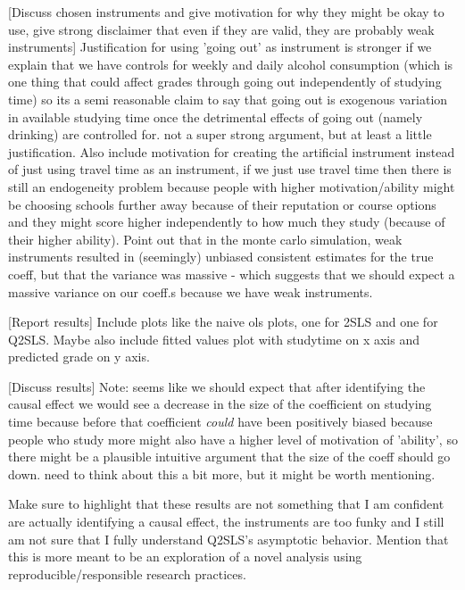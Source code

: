 \documentclass[12pt]{article}
\begin{document}
\textcolor{BrickRed}{[Discuss chosen instruments and give motivation for why they might be okay to use, give strong disclaimer that even if they are valid, they are probably weak instruments]} Justification for using 'going out' as instrument is stronger if we explain that we have controls for weekly and daily alcohol consumption (which is one thing that could affect grades through going out independently of studying time) so its a semi reasonable claim to say that going out is exogenous variation in available studying time once the detrimental effects of going out (namely drinking) are controlled for. not a super strong argument, but at least a little justification. Also include motivation for creating the artificial instrument instead of just using travel time as an instrument, if we just use travel time then there is still an endogeneity problem because people with higher motivation/ability might be choosing schools further away because of their reputation or course options and they might score higher independently to how much they study (because of their higher ability). Point out that in the monte carlo simulation, weak instruments resulted in (seemingly) unbiased consistent estimates for the true coeff, but that the variance was massive - which suggests that we should expect a massive variance on our coeff.s because we have weak instruments.

\textcolor{BrickRed}{[Report results]} Include plots like the naive ols plots, one for 2SLS and one for Q2SLS. Maybe also include fitted values plot with studytime on x axis and predicted grade on y axis.

\textcolor{BrickRed}{[Discuss results]} Note: seems like we should expect that after identifying the causal effect we would see a decrease in the size of the coefficient on studying time because before that coefficient \textit{could} have been positively biased because people who study more might also have a higher level of motivation of 'ability', so there might be a plausible intuitive argument that the size of the coeff should go down. need to think about this a bit more, but it might be worth mentioning.

Make sure to highlight that these results are not something that I am confident are actually identifying a causal effect, the instruments are too funky and I still am not sure that I fully understand Q2SLS's asymptotic behavior. Mention that this is more meant to be an exploration of a novel analysis using reproducible/responsible research practices.
\end{document}

